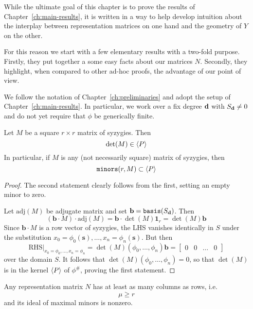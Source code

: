 \documentclass[fleqn,reqno]{amsart}
\newcounter{chapter}
\numberwithin{first}{chapter}
\begin{document}



\begin{paragraf*}
While the ultimate goal of this chapter is to prove the results of Chapter~\ref{ch:main-results},
it is written in a way to help develop intuition about the interplay between
representation matrices on one hand and the geometry of $Y$ on the other.

For this reason we start with a few elementary results with a two-fold purpose.
Firstly, they put together a some easy facts about our matrices $N$.
Secondly, they highlight, when compared to other ad-hoc proofs, the advantage of our point of view.
\end{paragraf*}

\begin{paragraf*}
We follow the notation of Chapter~\ref{ch:preliminaries} and
adopt the setup of Chapter~\ref{ch:main-results}.
In particular, we work over a fix degree $\mathbf d$ with $S_\mathbf d\neq0$
and do not yet require that $\phi$ be generically finite.
\end{paragraf*}

\begin{lemma}
\label{lemma:detM-P}
Let $M$ be a square $r\times r$ matrix of syzygies.
Then
\[
	\det(M)\in \langle P\rangle
\]
In particular, if $M$ is any (not necessarily square) matrix of syzygies, then
\[
	\mathop{\tt minors}(r,M)\subset\langle P\rangle
\]
\end{lemma}

\begin{proof}
The second statement clearly follows from the first, setting an empty minor to zero.

Let $\text{adj}(M)$ be adjugate matrix and set $\mathbf b=\mathop{\tt basis}(S_\mathbf d)$.
Then
\[
	(\mathbf b\cdot M)\cdot\text{adj}(M)=\mathbf b\cdot\det(M)\mathbf 1_r=\det(M)\mathbf b
\]
Since $\mathbf b\cdot M$ is a row vector of syzygies,
the LHS vanishes identically in $S$ under the substitution
$x_0=\phi_0(\mathbf s),\ldots,x_n=\phi_n(\mathbf s)$.
But then
\[
	\text{RHS}|_{x_0=\phi_0,\ldots,x_n=\phi_n}=\det(M)(\phi_0,\ldots,\phi_n)\mathbf b=
	\begin{bmatrix}0& 0& \ldots& 0\end{bmatrix}
\]
over the domain $S$.
It follows that $\det(M)(\phi_0,\ldots,\phi_n)=0$,
so that $\det(M)$ is in the kernel $\langle P\rangle$ of $\phi^\#$, proving the first statement.
\end{proof}

\begin{lemma}
\label{lemma:nonzero-detM}
Any representation matrix $N$ has at least as many columns as rows, i.e.
\[
	\mu\geq r
\]
and its ideal of maximal minors is nonzero.
\end{lemma}
\end{document}
